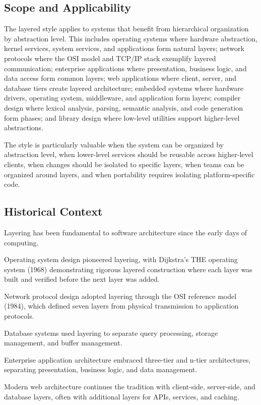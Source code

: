 \documentclass[11pt]{article}
\begin{document}
\subsection{Scope and Applicability}

The layered style applies to systems that benefit from hierarchical organization by abstraction level. This includes operating systems where hardware abstraction, kernel services, system services, and applications form natural layers; network protocols where the OSI model and TCP/IP stack exemplify layered communication; enterprise applications where presentation, business logic, and data access form common layers; web applications where client, server, and database tiers create layered architecture; embedded systems where hardware drivers, operating system, middleware, and application form layers; compiler design where lexical analysis, parsing, semantic analysis, and code generation form phases; and library design where low-level utilities support higher-level abstractions.

The style is particularly valuable when the system can be organized by abstraction level, when lower-level services should be reusable across higher-level clients, when changes should be isolated to specific layers, when teams can be organized around layers, and when portability requires isolating platform-specific code.

\subsection{Historical Context}

Layering has been fundamental to software architecture since the early days of computing.

Operating system design pioneered layering, with Dijkstra's THE operating system (1968) demonstrating rigorous layered construction where each layer was built and verified before the next layer was added.

Network protocol design adopted layering through the OSI reference model (1984), which defined seven layers from physical transmission to application protocols.

Database systems used layering to separate query processing, storage management, and buffer management.

Enterprise application architecture embraced three-tier and n-tier architectures, separating presentation, business logic, and data management.

Modern web architecture continues the tradition with client-side, server-side, and database layers, often with additional layers for APIs, services, and caching.
\end{document}
